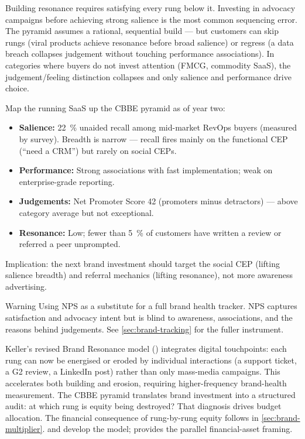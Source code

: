 Building resonance requires satisfying every rung below it. Investing in advocacy campaigns before achieving strong salience is the most common sequencing error. The pyramid assumes a rational, sequential build --- but customers can skip rungs (viral products achieve resonance before broad salience) or regress (a data breach collapses judgement without touching performance associations). In categories where buyers do not invest attention (FMCG, commodity SaaS), the judgement/feeling distinction collapses and only salience and performance drive choice.

\begin{example}
Map the running SaaS up the CBBE pyramid as of year two:
\begin{itemize}
  \item \textbf{Salience:} \qty{22}{\percent} unaided recall among mid-market RevOps buyers (measured by survey). Breadth is narrow --- recall fires mainly on the functional CEP (``need a CRM'') but rarely on social CEPs.
  \item \textbf{Performance:} Strong associations with fast implementation; weak on enterprise-grade reporting.
  \item \textbf{Judgements:} Net Promoter Score 42 (promoters minus detractors) --- above category average but not exceptional.
  \item \textbf{Resonance:} Low; fewer than \qty{5}{\percent} of customers have written a review or referred a peer unprompted.
\end{itemize}
Implication: the next brand investment should target the social CEP (lifting salience breadth) and referral mechanics (lifting resonance), not more awareness advertising.
\end{example}

\begin{admonition}{Warning}
Using NPS as a substitute for a full brand health tracker. NPS captures satisfaction and advocacy intent but is blind to awareness, associations, and the reasons behind judgements. See \cref{sec:brand-tracking} for the fuller instrument.
\end{admonition}

Keller's revised Brand Resonance model (\textcite{keller2019}) integrates digital touchpoints: each rung can now be energised or eroded by individual interactions (a support ticket, a G2 review, a LinkedIn post) rather than only mass-media campaigns. This accelerates both building and erosion, requiring higher-frequency brand-health measurement. The CBBE pyramid translates brand investment into a structured audit: at which rung is equity being destroyed? That diagnosis drives budget allocation. The financial consequence of rung-by-rung equity follows in \cref{sec:brand-multiplier}. \textcite{keller1993customer} and \textcite{keller2019} develop the model; \textcite{aaker1996} provides the parallel financial-asset framing.

